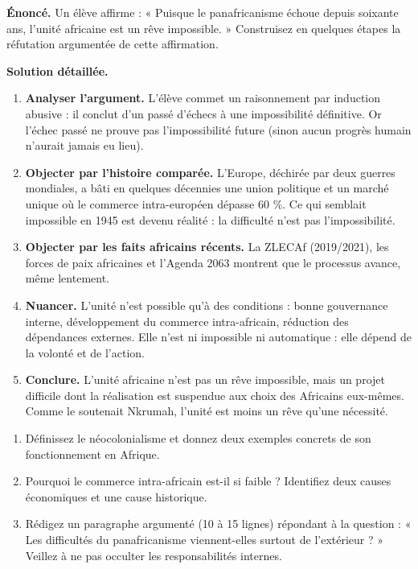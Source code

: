 \documentclass[11pt]{article}
\begin{document}
\begin{exoresolu}
\textbf{Énoncé.} Un élève affirme : « Puisque le panafricanisme échoue depuis soixante ans, l'unité africaine est un rêve impossible. » Construisez en quelques étapes la réfutation argumentée de cette affirmation.

\tcblower
\textbf{Solution détaillée.}
\begin{enumerate}
\item \textbf{Analyser l'argument.} L'élève commet un raisonnement par induction abusive : il conclut d'un passé d'échecs à une impossibilité définitive. Or l'échec passé ne prouve pas l'impossibilité future (sinon aucun progrès humain n'aurait jamais eu lieu).
\item \textbf{Objecter par l'histoire comparée.} L'Europe, déchirée par deux guerres mondiales, a bâti en quelques décennies une union politique et un marché unique où le commerce intra-européen dépasse 60 \%. Ce qui semblait impossible en 1945 est devenu réalité : la difficulté n'est pas l'impossibilité.
\item \textbf{Objecter par les faits africains récents.} La ZLECAf (2019/2021), les forces de paix africaines et l'Agenda 2063 montrent que le processus avance, même lentement.
\item \textbf{Nuancer.} L'unité n'est possible qu'à des conditions : bonne gouvernance interne, développement du commerce intra-africain, réduction des dépendances externes. Elle n'est ni impossible ni automatique : elle dépend de la volonté et de l'action.
\item \textbf{Conclure.} L'unité africaine n'est pas un rêve impossible, mais un projet difficile dont la réalisation est suspendue aux choix des Africains eux-mêmes. Comme le soutenait Nkrumah, l'unité est moins un rêve qu'une nécessité.
\end{enumerate}
\end{exoresolu}

\begin{exercice}
\begin{enumerate}
\item Définissez le néocolonialisme et donnez deux exemples concrets de son fonctionnement en Afrique.
\item Pourquoi le commerce intra-africain est-il si faible ? Identifiez deux causes économiques et une cause historique.
\item Rédigez un paragraphe argumenté (10 à 15 lignes) répondant à la question : « Les difficultés du panafricanisme viennent-elles surtout de l'extérieur ? » Veillez à ne pas occulter les responsabilités internes.
\end{enumerate}
\end{exercice}
\end{document}
